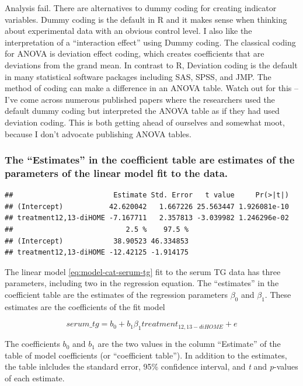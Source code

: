 \documentclass[]{book}
\begin{document}
Analysis fail. There are alternatives to dummy coding for creating indicator variables. Dummy coding is the default in R and it makes sense when thinking about experimental data with an obvious control level. I also like the interpretation of a ``interaction effect'' using Dummy coding. The classical coding for ANOVA is deviation effect coding, which creates coefficients that are deviations from the grand mean. In contrast to R, Deviation coding is the default in many statistical software packages including SAS, SPSS, and JMP. The method of coding can make a difference in an ANOVA table. Watch out for this -- I've come across numerous published papers where the researchers used the default dummy coding but interpreted the ANOVA table as if they had used deviation coding. This is both getting ahead of ourselves and somewhat moot, because I don't advocate publishing ANOVA tables.

\hypertarget{the-estimates-in-the-coefficient-table-are-estimates-of-the-parameters-of-the-linear-model-fit-to-the-data.}{%
\subsubsection{The ``Estimates'' in the coefficient table are estimates of the parameters of the linear model fit to the data.}\label{the-estimates-in-the-coefficient-table-are-estimates-of-the-parameters-of-the-linear-model-fit-to-the-data.}}

\begin{verbatim}
##                        Estimate Std. Error   t value     Pr(>|t|)
## (Intercept)           42.620042   1.667226 25.563447 1.926081e-10
## treatment12,13-diHOME -7.167711   2.357813 -3.039982 1.246296e-02
##                           2.5 %    97.5 %
## (Intercept)            38.90523 46.334853
## treatment12,13-diHOME -12.42125 -1.914175
\end{verbatim}

The linear model \eqref{eq:model-cat-serum-tg} fit to the serum TG data has three parameters, including two in the regression equation. The ``estimates'' in the coefficient table are the estimates of the regression parameters \(\beta_0\) and \(\beta_1\). These estimates are the coefficients of the fit model

\begin{equation}
serum\_tg = b_0 + b_1 \beta_1 treatment_{12,13-diHOME} + e
\label{eq:fit-serum-tg}
\end{equation}

The coefficients \(b_0\) and \(b_1\) are the two values in the column ``Estimate'' of the table of model coefficients (or ``coefficient table''). In addition to the estimates, the table inlcludes the standard error, 95\% confidence interval, and \emph{t} and \emph{p}-values of each estimate.
\end{document}

